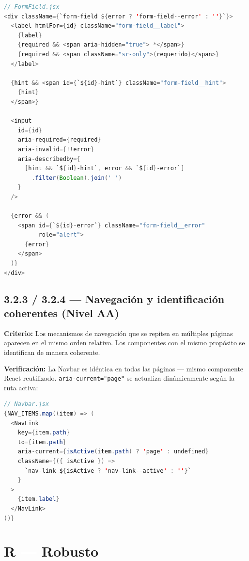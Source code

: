 \documentclass[12pt, a4paper]{article}
\begin{document}
\begin{evidbox}
\begin{lstlisting}[language=Java]
// FormField.jsx
<div className={`form-field ${error ? 'form-field--error' : ''}`}>
  <label htmlFor={id} className="form-field__label">
    {label}
    {required && <span aria-hidden="true"> *</span>}
    {required && <span className="sr-only">(requerido)</span>}
  </label>

  {hint && <span id={`${id}-hint`} className="form-field__hint">
    {hint}
  </span>}

  <input
    id={id}
    aria-required={required}
    aria-invalid={!!error}
    aria-describedby={
      [hint && `${id}-hint`, error && `${id}-error`]
        .filter(Boolean).join(' ')
    }
  />

  {error && (
    <span id={`${id}-error`} className="form-field__error"
          role="alert">
      {error}
    </span>
  )}
</div>
\end{lstlisting}
\end{evidbox}

\subsection{3.2.3 / 3.2.4 --- Navegación y identificación coherentes (Nivel AA)}

\textbf{Criterio:} Los mecanismos de navegación que se repiten en múltiples páginas aparecen en el mismo orden relativo. Los componentes con el mismo propósito se identifican de manera coherente.

\textbf{Verificación:} La Navbar es idéntica en todas las páginas --- mismo componente React reutilizado. \texttt{aria-current="page"} se actualiza dinámicamente según la ruta activa:

\begin{evidbox}
\begin{lstlisting}[language=Java]
// Navbar.jsx
{NAV_ITEMS.map((item) => (
  <NavLink
    key={item.path}
    to={item.path}
    aria-current={isActive(item.path) ? 'page' : undefined}
    className={({ isActive }) =>
      `nav-link ${isActive ? 'nav-link--active' : ''}`
    }
  >
    {item.label}
  </NavLink>
))}
\end{lstlisting}
\end{evidbox}

\section{R --- Robusto}
\end{document}
